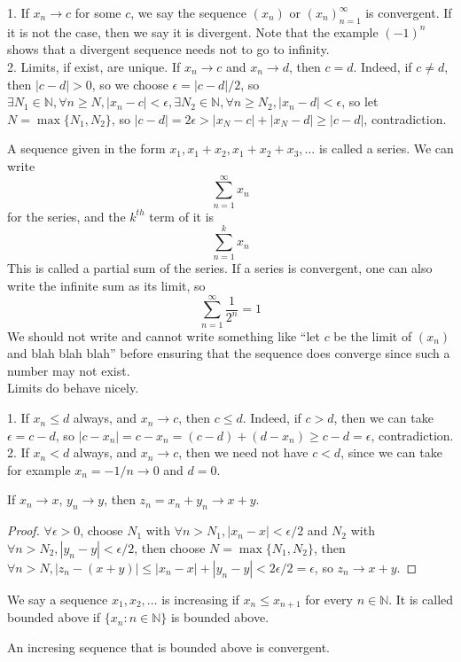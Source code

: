 \begin{remark}
    1. If $x_n\to c$ for some $c$, we say the sequence $(x_n)$ or $(x_n)_{n=1}^\infty$ is convergent.
    If it is not the case, then we say it is divergent.
    Note that the example $(-1)^n$ shows that a divergent sequence needs not to go to infinity.\\
    2. Limits, if exist, are unique.
    If $x_n\to c$ and $x_n\to d$, then $c=d$.
    Indeed, if $c\neq d$, then $|c-d|>0$, so we choose $\epsilon=|c-d|/2$, so $\exists N_1\in\mathbb N,\forall n\ge N, |x_n-c|<\epsilon,\exists N_2\in\mathbb N,\forall n\ge N_2, |x_n-d|<\epsilon$, so let $N=\max\{N_1,N_2\}$, so $|c-d|=2\epsilon >|x_N-c|+|x_N-d|\ge |c-d|$, contradiction.
\end{remark}
A sequence given in the form $x_1,x_1+x_2,x_1+x_2+x_3,\ldots$ is called a series.
We can write
$$\sum_{n=1}^\infty x_n$$
for the series, and the $k^{th}$ term of it is
$$\sum_{n=1}^k x_n$$
This is called a partial sum of the series.
If a series is convergent, one can also write the infinite sum as its limit, so
$$\sum_{n=1}^\infty \frac{1}{2^n}=1$$
We should not write and cannot write something like ``let $c$ be the limit of $(x_n)$ and blah blah blah'' before ensuring that the sequence does converge since such a number may not exist.\\
Limits do behave nicely.
\begin{example}
    1. If $x_n\le d$ always, and $x_n\to c$, then $c\le d$.
    Indeed, if $c>d$, then we can take $\epsilon=c-d$, so $|c-x_n|=c-x_n=(c-d)+(d-x_n)\ge c-d=\epsilon$, contradiction.\\
    2. If $x_n<d$ always, and $x_n\to c$, then we need not have $c<d$, since we can take for example $x_n=-1/n\to 0$ and $d=0$.
\end{example}
\begin{proposition}
    If $x_n\to x$, $y_n\to y$, then $z_n=x_n+y_n\to x+y$.
\end{proposition}
\begin{proof}
    $\forall\epsilon>0$, choose $N_1$ with $\forall n>N_1, |x_n-x|<\epsilon/2$ and $N_2$ with $\forall n>N_2, |y_n-y|<\epsilon/2$, then choose $N=\max\{N_1,N_2\}$, then $\forall n>N,|z_n-(x+y)|\le |x_n-x|+|y_n-y|<2\epsilon/2=\epsilon$, so $z_n\to x+y$.
\end{proof}
We say a sequence $x_1,x_2,\ldots$ is increasing if $x_n\le x_{n+1}$ for every $n\in\mathbb N$.
It is called bounded above if $\{x_n:n\in\mathbb N\}$ is bounded above.
\begin{theorem}
    An incresing sequence that is bounded above is convergent.    
\end{theorem}
